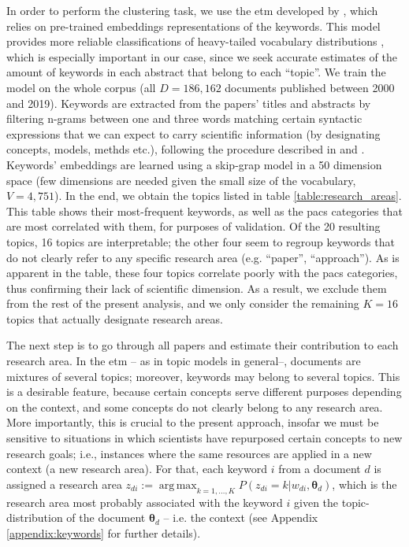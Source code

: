 \documentclass{article}
\DeclareMathOperator*{\argmax}{arg\,max}
\begin{document}
In order to perform the clustering task, we use the \gls{etm} developed by \citealt{Dieng2020}, which relies on pre-trained embeddings representations of the keywords. This model provides more reliable classifications of heavy-tailed vocabulary distributions%
, which is especially important in our case, since we seek accurate estimates of the amount of keywords in each abstract that belong to each ``topic''. We train the model on the whole corpus (all $D=186,162$ documents published between 2000 and 2019). Keywords are extracted from the papers' titles and abstracts by filtering n-grams between one and three words matching certain syntactic expressions that we can expect to carry scientific information (by designating concepts, models, methds etc.), following the procedure described in \citealt{Gautheron2023} and \citealt{omodei_tel-01097702}. Keywords' embeddings are learned using a skip-grap model in a 50 dimension space (few dimensions are needed given the small size of the vocabulary, $V=4,751$). In the end, we obtain the topics listed in table \ref{table:research_areas}. This table shows their most-frequent keywords, as well as the \gls{pacs} categories that are most correlated with them, for purposes of validation. Of the 20 resulting topics, 16 topics are interpretable; the other four seem to regroup keywords that do not clearly refer to any specific research area (e.g. ``paper'', ``approach''). As is apparent in the table, these four topics correlate poorly with the \gls{pacs} categories, thus confirming their lack of scientific dimension. As a result, we exclude them from the rest of the present analysis, and we only consider the remaining $K=16$ topics that actually designate research areas.

The next step is to go through all papers and estimate their contribution to each research area. In the \gls{etm} -- as in topic models in general--, documents are mixtures of several topics; moreover, keywords may belong to several topics. This is a desirable feature, because certain concepts serve different purposes depending on the context, and some concepts do not clearly belong to any research area. More importantly, this is crucial to the present approach, insofar we must be sensitive to situations in which scientists have repurposed certain concepts to new research goals; i.e., instances where the same resources are applied in a new context (a new research area). %
For that, each keyword $i$ from a document $d$ is assigned a research area $z_{di} := \argmax_{k=1,\dots,K} P(z_{di}=k|w_{di},\bm{\theta}_{d})$, which is the research area most probably associated with the keyword $i$ given the topic-distribution of the document $\bm{\theta}_d$ -- i.e. the context (see Appendix \ref{appendix:keywords} for further details).
\end{document}
